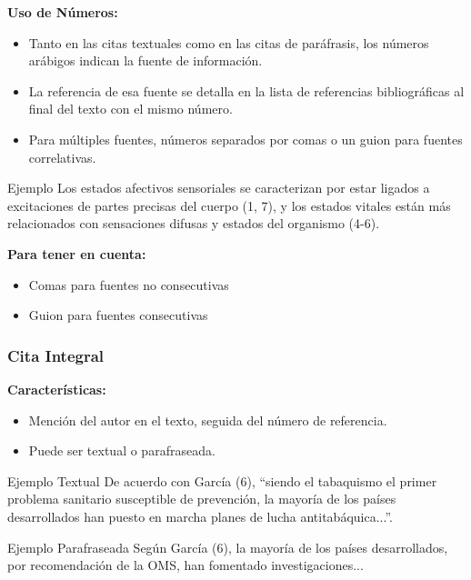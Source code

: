 \documentclass[
11pt, %
]{beamer}
\begin{document}
\begin{frame}
	\textbf{Uso de Números:}
	\begin{itemize}
		\item Tanto en las citas textuales como en las citas de paráfrasis, los números arábigos indican la fuente de información.
		\item La referencia de esa fuente se detalla en la lista de referencias bibliográficas al final del texto con el mismo número.
		\item Para múltiples fuentes, números separados por comas o un guion para fuentes correlativas.
	\end{itemize}

	\begin{exampleblock}{Ejemplo}
		Los estados afectivos sensoriales se caracterizan por estar ligados a excitaciones de partes precisas del cuerpo (1, 7), y los estados vitales están más relacionados con sensaciones difusas y estados del organismo (4-6).
	\end{exampleblock}

	\textbf{Para tener en cuenta:}
	\begin{itemize}
		\item Comas para fuentes no consecutivas
		\item Guion para fuentes consecutivas
	\end{itemize}

\end{frame}


\begin{frame}
	\frametitle{Cita Integral}

	\textbf{Características:}
	\begin{itemize}
		\item Mención del autor en el texto, seguida del número de referencia.
		\item Puede ser textual o parafraseada.
	\end{itemize}

	\begin{exampleblock}{Ejemplo Textual}
		De acuerdo con García (6), “siendo el tabaquismo el primer problema sanitario susceptible de prevención, la mayoría de los países desarrollados han puesto en marcha planes de lucha antitabáquica...”.
	\end{exampleblock}

	\begin{exampleblock}{Ejemplo Parafraseada}
		Según García (6), la mayoría de los países desarrollados, por recomendación de la OMS, han fomentado investigaciones...
	\end{exampleblock}

\end{frame}
\end{document}
